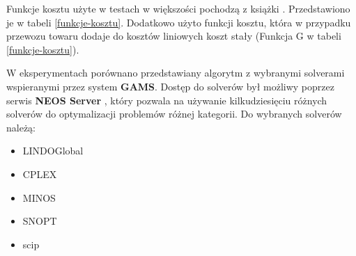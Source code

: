 Funkcje kosztu użyte w testach w większości pochodzą z książki \cite{ALG-GEN-BOOK}. Przedstawiono je w tabeli \ref{funkcje-kosztu}. Dodatkowo 
użyto funkcji kosztu, która w przypadku przewozu towaru dodaje do kosztów liniowych koszt stały (Funkcja G w tabeli \ref{funkcje-kosztu}).

W eksperymentach porównano przedstawiany algorytm z wybranymi solverami wspieranymi przez system \textbf{GAMS}. Dostęp do solverów był możliwy poprzez serwis 
\textbf{NEOS Server} \cite{NEOS-1,NEOS-2,NEOS-3}, który pozwala na używanie kilkudziesięciu różnych solverów do optymalizacji problemów różnej kategorii. Do wybranych 
solverów należą:

\begin{itemize}
    \item LINDOGlobal
    \item CPLEX
    \item MINOS
    \item SNOPT
    \item scip
\end{itemize}

\newpage

